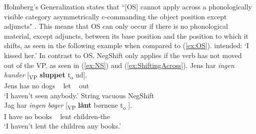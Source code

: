\documentclass[12pt, letterpaper]{article}
\newcommand{\sub}[1]{\textsubscript{#1}}
\begin{document}
Holmberg's Generalization states that ``[OS] cannot apply across a phonologically visible category asymmetrically c-commanding the object position except adjuncts" \citep[15]{holmbergRemarksHolmbergGeneralization1999}. This means that OS can only occur if there is no phonological material, except adjuncts, between its base position and the position to which it shifts, as seen in the following example when compared to (\ref{ex:OS}). 
		\glt intended: `I kissed her.' \label{ex:OS-Ungrammatical}
	\z 
In contrast to OS, NegShift only applies if the verb has not moved out of the VP, as seen in (\ref{ex:NS}) and (\ref{ex:ShiftingAcross}). 
	\ea \label{ex:ShiftingAcross}
		\ea
		{\gll Jens har \textit{ingen} \emph{hunder} [\sub{VP} \textbf{sluppet} t\sub{o}	ud].\\
			Jens has no dogs ~ let ~ out\\}
		\glt `I haven't seen anybody.'
		\ex \label{ex:String} String vacuous NegShift\\
		{\gll Jag har \textit{ingen} \emph{bøger} [\sub{VP} \textbf{lånt} børnene t\sub{o}  ].\\
		I have no books ~ lent children-the \\}
		\glt `I haven't lent the children any books.'
		\z
	\z 
\end{document}
